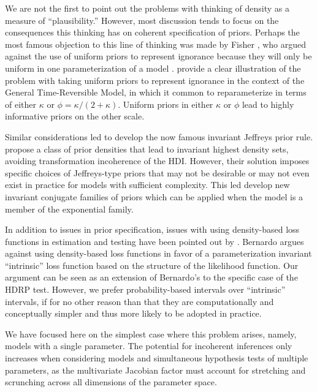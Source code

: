 \documentclass[man]{apa}
\newcommand{\hdr}{HDRP}
\begin{document}
We are not the first to point out the problems with thinking of density as a measure of ``plausibility.'' However, most discussion tends to focus on the consequences this thinking has on coherent specification of priors. Perhaps the most famous objection to this line of thinking was made by Fisher \cite{lehmann2011fisher}, who argued against the use of uniform priors to represent ignorance because they will only be uniform in one parameterization of a model \cite<for a thorough demonstration see>{ly2017tutorial}.  provide a clear illustration of the problem with taking uniform priors to represent ignorance in the context of the General Time-Reversible Model, in which it common to reparameterize in terms of either $\kappa$ or $\phi = \kappa/(2+\kappa)$. Uniform priors in either $\kappa$ or $\phi$ lead to highly informative priors on the other scale. 

Similar considerations led  to develop the now famous invariant Jeffreys prior rule.  propose a class of prior densities that lead to invariant highest density sets, avoiding transformation incoherence of the HDI. However, their solution imposes specific choices of Jeffreys-type priors that may not be desirable or may not even exist in practice for models with sufficient complexity. This led  develop new invariant conjugate families of priors which can be applied when the model is a member of the exponential family. 

In addition to issues in prior specification, issues with using density-based loss functions in estimation and testing have been pointed out by . Bernardo argues against using density-based loss functions in favor of a parameterization invariant ``intrinsic'' loss function based on the structure of the likelihood function. Our argument can be seen as an extension of Bernardo's to the specific case of the \hdr{} test. However, we prefer probability-based intervals over ``intrinsic'' intervals, if for no other reason than that they are computationally and conceptually simpler and thus more likely to be adopted in practice. 

We have focused here on the simplest case where this problem arises, namely, models with a single parameter. The potential for incoherent inferences only increases when considering models and simultaneous hypothesis tests of multiple parameters, as the multivariate Jacobian factor must account for stretching and scrunching across all dimensions of the parameter space. 
\end{document}
